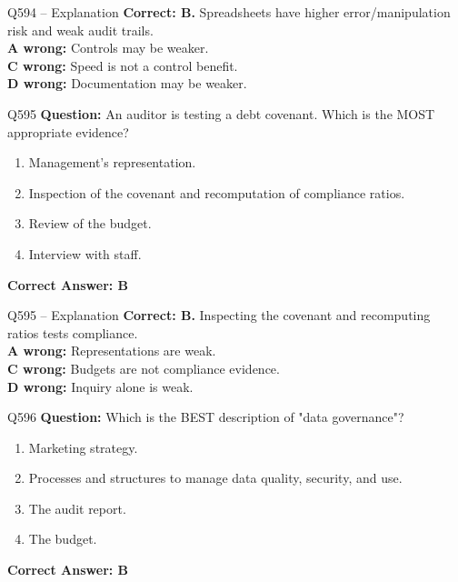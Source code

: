 \documentclass[aspectratio=169,10pt]{beamer}
\begin{document}
	\begin{frame}[t]{Q594 -- Explanation}
		\small
		\textbf{Correct: B.} Spreadsheets have higher error/manipulation risk and weak audit trails. \\[4pt]
		\textbf{A wrong:} Controls may be weaker. \\[2pt]
		\textbf{C wrong:} Speed is not a control benefit. \\[2pt]
		\textbf{D wrong:} Documentation may be weaker.
	\end{frame}
	
	\begin{frame}[t]{Q595}
		\small
		\textbf{Question:} An auditor is testing a debt covenant. Which is the MOST appropriate evidence?
		\begin{enumerate}[label=\Alph*.,itemsep=1pt,topsep=2pt]
			\item Management's representation.
			\item Inspection of the covenant and recomputation of compliance ratios.
			\item Review of the budget.
			\item Interview with staff.
		\end{enumerate}
		\vspace{4pt}
		\textbf{Correct Answer: B}
	\end{frame}
	
	\begin{frame}[t]{Q595 -- Explanation}
		\small
		\textbf{Correct: B.} Inspecting the covenant and recomputing ratios tests compliance. \\[4pt]
		\textbf{A wrong:} Representations are weak. \\[2pt]
		\textbf{C wrong:} Budgets are not compliance evidence. \\[2pt]
		\textbf{D wrong:} Inquiry alone is weak.
	\end{frame}
	
	\begin{frame}[t]{Q596}
		\small
		\textbf{Question:} Which is the BEST description of "data governance"?
		\begin{enumerate}[label=\Alph*.,itemsep=1pt,topsep=2pt]
			\item Marketing strategy.
			\item Processes and structures to manage data quality, security, and use.
			\item The audit report.
			\item The budget.
		\end{enumerate}
		\vspace{4pt}
		\textbf{Correct Answer: B}
	\end{frame}
	
\end{document}
